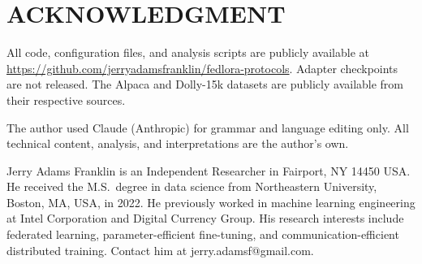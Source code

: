 \documentclass{ieeetj}
\begin{document}
\maketitle



\section*{ACKNOWLEDGMENT}
All code, configuration
files, and analysis scripts are publicly available at
\url{https://github.com/jerryadamsfranklin/fedlora-protocols}. Adapter checkpoints are
not released. The Alpaca and Dolly-15k datasets are publicly available from
their respective sources.

The author used Claude (Anthropic) for grammar and language editing only. All
technical content, analysis, and interpretations are the author's own.




\begin{IEEEbiographynophoto}{Jerry Adams Franklin}
is an Independent Researcher in Fairport, NY 14450 USA.
He received the M.S.\ degree in data science from Northeastern University, Boston, MA, USA, in 2022.
He previously worked in machine learning engineering at Intel Corporation
and Digital Currency Group.
His research interests include federated learning, parameter-efficient
fine-tuning, and communication-efficient distributed training.
Contact him at jerry.adamsf@gmail.com.
\end{IEEEbiographynophoto}

\vfill
\pagebreak
\end{document}
